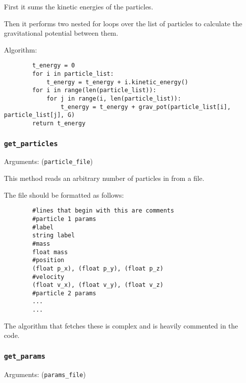 \documentclass[a4paper, 11pt, british, left=1in, right=1in, top=0.3in, bottom=1in]{article}
\begin{document}
	First it sums the kinetic energies of the particles. 
	
	Then it performs two nested for loops over the list of particles to calculate the gravitational potential between them.
	
	Algorithm:
	
	\begin{verbatim}
		t_energy = 0
		for i in particle_list:
		    t_energy = t_energy + i.kinetic_energy()
		for i in range(len(particle_list)):
		    for j in range(i, len(particle_list)):
		        t_energy = t_energy + grav_pot(particle_list[i], particle_list[j], G)
		return t_energy
	\end{verbatim}
	
	\subsubsection{\texttt{get\_particles}}
	
	Arguments: (\texttt{particle\_file})
	
	This method reads an arbitrary number of particles in from a file. 
	
	The file should be formatted as follows:
	
	\begin{verbatim}
		#lines that begin with this are comments
		#particle 1 params
		#label
		string label
		#mass
		float mass
		#position
		(float p_x), (float p_y), (float p_z)
		#velocity
		(float v_x), (float v_y), (float v_z)
		#particle 2 params
		...
		...
	\end{verbatim}
	
	The algorithm that fetches these is complex and is heavily commented in the code. 
	
	\subsubsection{\texttt{get\_params}}
	
	Arguments: (\texttt{params\_file})
\end{document}
